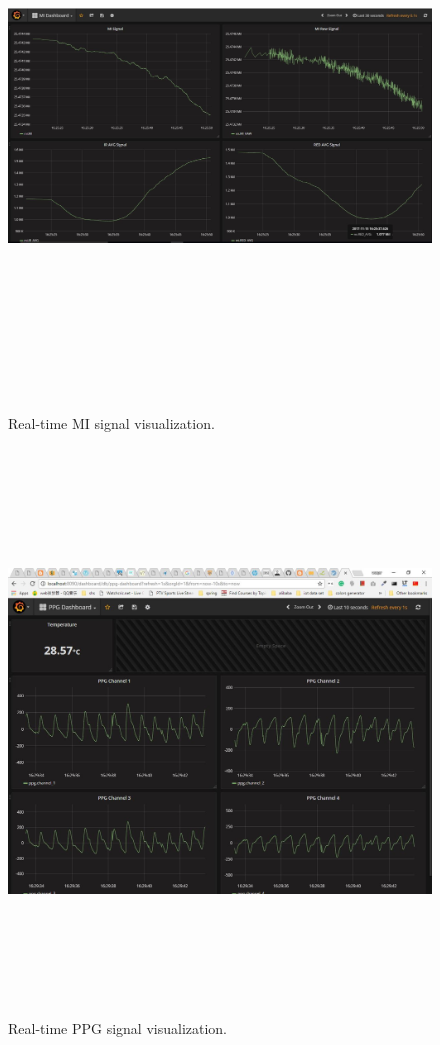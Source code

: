 \begin{figure}[htpb]
	\centering
	\includegraphics[width=16cm,height=15cm,keepaspectratio=true]{images/mi_dsh}
	\caption{
		Real-time MI signal visualization.
	}
	\label{fig:mi_dsh}
\end{figure}

\begin{figure}[htpb]
	\centering
	\includegraphics[width=16cm,height=15cm,keepaspectratio=true]{images/ppg_dsh}
	\caption{
		Real-time PPG signal visualization.
	}
	\label{fig:ppg_dsh}
\end{figure}


